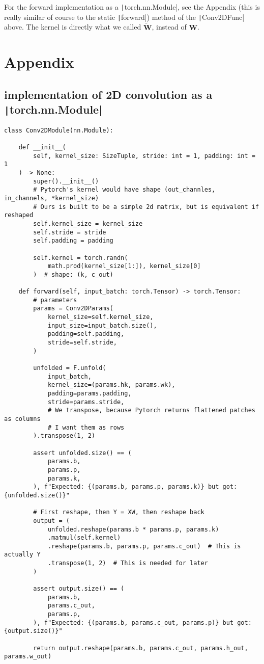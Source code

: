 \documentclass{article}
\begin{document}
\noindent For the forward implementation as a \texttt|torch.nn.Module|, see the Appendix (this is really similar of course to the static \texttt|forward|) method of the \texttt|Conv2DFunc| above. The kernel is directly what we called \(\mathbf{\tilde{W}}\), instead of \(\mathbf{W}\). 

\pagebreak %

\appendix
\section{Appendix}

\subsection*{implementation of 2D convolution as a \texttt|torch.nn.Module|}
\begin{verbatim}
class Conv2DModule(nn.Module):

    def __init__(
        self, kernel_size: SizeTuple, stride: int = 1, padding: int = 1
    ) -> None:
        super().__init__()
        # Pytorch's kernel would have shape (out_channles, in_channels, *kernel_size)
        # Ours is built to be a simple 2d matrix, but is equivalent if reshaped
        self.kernel_size = kernel_size
        self.stride = stride
        self.padding = padding

        self.kernel = torch.randn(
            math.prod(kernel_size[1:]), kernel_size[0]
        )  # shape: (k, c_out)

    def forward(self, input_batch: torch.Tensor) -> torch.Tensor:
        # parameters
        params = Conv2DParams(
            kernel_size=self.kernel_size,
            input_size=input_batch.size(),
            padding=self.padding,
            stride=self.stride,
        )

        unfolded = F.unfold(
            input_batch,
            kernel_size=(params.hk, params.wk),
            padding=params.padding,
            stride=params.stride,
            # We transpose, because Pytorch returns flattened patches as columns
            # I want them as rows
        ).transpose(1, 2)

        assert unfolded.size() == (
            params.b,
            params.p,
            params.k,
        ), f"Expected: {(params.b, params.p, params.k)} but got: {unfolded.size()}"

        # First reshape, then Y = XW, then reshape back
        output = (
            unfolded.reshape(params.b * params.p, params.k)
            .matmul(self.kernel)
            .reshape(params.b, params.p, params.c_out)  # This is actually Y
            .transpose(1, 2)  # This is needed for later
        )

        assert output.size() == (
            params.b,
            params.c_out,
            params.p,
        ), f"Expected: {(params.b, params.c_out, params.p)} but got: {output.size()}"

        return output.reshape(params.b, params.c_out, params.h_out, params.w_out)
\end{verbatim}
\end{document}
